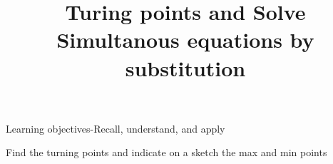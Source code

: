 \documentclass[12pt, a4paper, addpoints]{exam}
\title{Turing points and Solve Simultanous equations by substitution}
\date{}
\newcommand{\ts}{\vspace{22 mm}}
\newcommand{\bs}{\vspace{44mm}}
\newcommand{\cubicwithtps}[3]{
    \pgfmathtruncatemacro{\a}{3*#1}  %
    \pgfmathtruncatemacro{\b}{6*#2}  %

    $y = 2x^3 
    \ifnum\a>0 + \a x^2 \else \a x^2 \fi 
    \ifnum\b>0 + \b x \else \b x \fi 
    \ifnum#3>0 + #3 \else #3 \fi$
}
\begin{document}

\maketitle
\vspace{-18mm}

\begin{questions}

\question Learning objectives-Recall, understand, and apply
\begin{multicols}{3}
\end{multicols}


\question Find the turning points and indicate on a sketch the max and min points

\begin{multicols}{2}
\end{multicols}
\bs


\end{questions}
\end{document}
